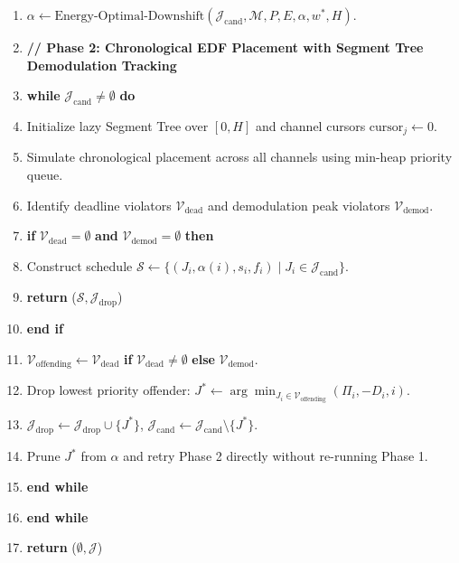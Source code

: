 \documentclass{article}
\begin{document}
\begin{algorithm}[t!]
\begin{enumerate}
    \item \quad $\alpha \leftarrow \text{Energy-Optimal-Downshift}(\mathcal{J}_{\text{cand}}, \mathcal{M}, P, E, \alpha, w^*, H)$.
    \item \quad \textbf{// Phase 2: Chronological EDF Placement with Segment Tree Demodulation Tracking}
    \item \quad \textbf{while} $\mathcal{J}_{\text{cand}} \neq \emptyset$ \textbf{do}
    \item \quad\quad Initialize lazy Segment Tree over $[0, H]$ and channel cursors $\text{cursor}_j \leftarrow 0$.
    \item \quad\quad Simulate chronological placement across all channels using min-heap priority queue.
    \item \quad\quad Identify deadline violators $\mathcal{V}_{\text{dead}}$ and demodulation peak violators $\mathcal{V}_{\text{demod}}$.
    \item \quad\quad \textbf{if} $\mathcal{V}_{\text{dead}} = \emptyset$ \textbf{and} $\mathcal{V}_{\text{demod}} = \emptyset$ \textbf{then}
    \item \quad\quad\quad Construct schedule $\mathcal{S} \leftarrow \{(J_i, \alpha(i), s_i, f_i) \mid J_i \in \mathcal{J}_{\text{cand}}\}$.
    \item \quad\quad\quad \textbf{return} ($\mathcal{S}, \mathcal{J}_{\text{drop}}$)
    \item \quad\quad \textbf{end if}
    \item \quad\quad $\mathcal{V}_{\text{offending}} \leftarrow \mathcal{V}_{\text{dead}}$ \textbf{if} $\mathcal{V}_{\text{dead}} \neq \emptyset$ \textbf{else} $\mathcal{V}_{\text{demod}}$.
    \item \quad\quad Drop lowest priority offender: $J^* \leftarrow \arg\min_{J_i \in \mathcal{V}_{\text{offending}}} (\Pi_i, -D_i, i)$.
    \item \quad\quad $\mathcal{J}_{\text{drop}} \leftarrow \mathcal{J}_{\text{drop}} \cup \{J^*\}$, $\mathcal{J}_{\text{cand}} \leftarrow \mathcal{J}_{\text{cand}} \setminus \{J^*\}$.
    \item \quad\quad Prune $J^*$ from $\alpha$ and retry Phase 2 directly without re-running Phase 1.
    \item \quad \textbf{end while}
    \item \textbf{end while}
    \item \textbf{return} ($\emptyset, \mathcal{J}$) 
\end{enumerate}
\end{algorithm}
\end{document}

